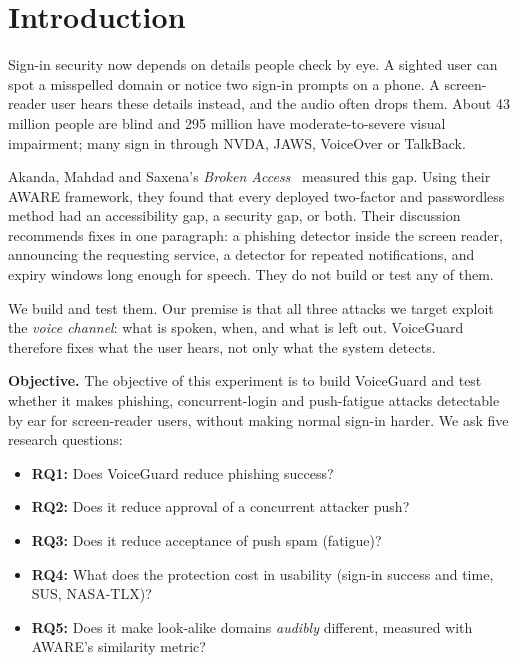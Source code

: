\documentclass[conference]{IEEEtran}
\begin{document}
\section{Introduction}

Sign-in security now depends on details people check by eye. A sighted user can spot a misspelled domain or notice two sign-in prompts on a phone. A screen-reader user hears these details instead, and the audio often drops them. About 43 million people are blind and 295 million have moderate-to-severe visual impairment; many sign in through NVDA, JAWS, VoiceOver or TalkBack.

Akanda, Mahdad and Saxena's \emph{Broken Access}~\cite{brokenaccess} measured this gap. Using their AWARE framework, they found that every deployed two-factor and passwordless method had an accessibility gap, a security gap, or both. Their discussion recommends fixes in one paragraph: a phishing detector inside the screen reader, announcing the requesting service, a detector for repeated notifications, and expiry windows long enough for speech. They do not build or test any of them.

We build and test them. Our premise is that all three attacks we target exploit the \emph{voice channel}: what is spoken, when, and what is left out. VoiceGuard therefore fixes what the user hears, not only what the system detects.

\textbf{Objective.} The objective of this experiment is to build VoiceGuard and test whether it makes phishing, concurrent-login and push-fatigue attacks detectable by ear for screen-reader users, without making normal sign-in harder. We ask five research questions:
\begin{itemize}
\item \textbf{RQ1:} Does VoiceGuard reduce phishing success?
\item \textbf{RQ2:} Does it reduce approval of a concurrent attacker push?
\item \textbf{RQ3:} Does it reduce acceptance of push spam (fatigue)?
\item \textbf{RQ4:} What does the protection cost in usability (sign-in success and time, SUS, NASA-TLX)?
\item \textbf{RQ5:} Does it make look-alike domains \emph{audibly} different, measured with AWARE's similarity metric?
\end{itemize}
\end{document}
